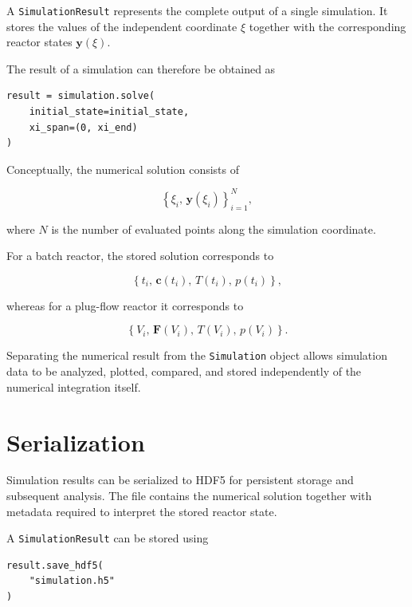 A \texttt{SimulationResult} represents the complete output of a single
simulation. It stores the values of the independent coordinate $\xi$ together
with the corresponding reactor states $\mathbf{y}(\xi)$.

The result of a simulation can therefore be obtained as

\begin{verbatim}
result = simulation.solve(
    initial_state=initial_state,
    xi_span=(0, xi_end)
)
\end{verbatim}

Conceptually, the numerical solution consists of

\begin{equation}
    \left\{
        \xi_i,\,
        \mathbf{y}(\xi_i)
    \right\}_{i=1}^{N},
\end{equation}

where $N$ is the number of evaluated points along the simulation coordinate.

For a batch reactor, the stored solution corresponds to

\begin{equation}
    \left\{
        t_i,\,
        \mathbf{c}(t_i),\,
        T(t_i),\,
        p(t_i)
    \right\},
\end{equation}

whereas for a plug-flow reactor it corresponds to

\begin{equation}
    \left\{
        V_i,\,
        \mathbf{F}(V_i),\,
        T(V_i),\,
        p(V_i)
    \right\}.
\end{equation}

Separating the numerical result from the \texttt{Simulation} object allows
simulation data to be analyzed, plotted, compared, and stored independently
of the numerical integration itself.


\section{Serialization}

Simulation results can be serialized to HDF5 for persistent storage and
subsequent analysis. The file contains the numerical solution together with
metadata required to interpret the stored reactor state.

A \texttt{SimulationResult} can be stored using

\begin{verbatim}
result.save_hdf5(
    "simulation.h5"
)
\end{verbatim}

